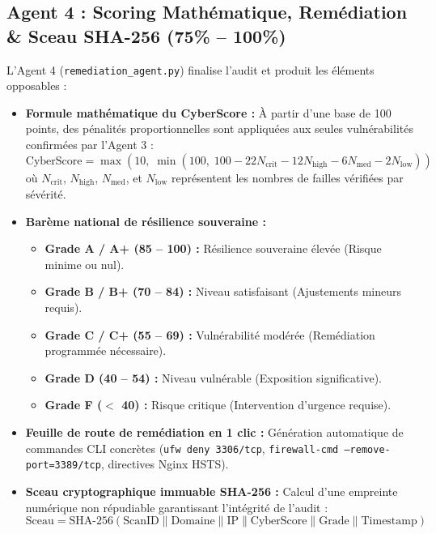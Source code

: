 \documentclass[11pt,a4paper,oneside]{article}
\begin{document}
\subsection{Agent 4 : Scoring Mathématique, Remédiation \& Sceau SHA-256 (75\% -- 100\%)}
L'Agent 4 (\texttt{remediation\_agent.py}) finalise l'audit et produit les éléments opposables :
\begin{itemize}
    \item \textbf{Formule mathématique du CyberScore :} À partir d'une base de 100 points, des pénalités proportionnelles sont appliquées aux seules vulnérabilités confirmées par l'Agent 3 :
    \begin{equation}
        \text{CyberScore} = \max\left(10, \; \min\left(100, \; 100 - 22 N_{\text{crit}} - 12 N_{\text{high}} - 6 N_{\text{med}} - 2 N_{\text{low}}\right)\right)
    \end{equation}
    où $N_{\text{crit}}$, $N_{\text{high}}$, $N_{\text{med}}$, et $N_{\text{low}}$ représentent les nombres de failles vérifiées par sévérité.
    \item \textbf{Barème national de résilience souveraine :}
    \begin{itemize}
        \item \textbf{Grade A / A+ (85 -- 100) :} Résilience souveraine élevée (Risque minime ou nul).
        \item \textbf{Grade B / B+ (70 -- 84) :} Niveau satisfaisant (Ajustements mineurs requis).
        \item \textbf{Grade C / C+ (55 -- 69) :} Vulnérabilité modérée (Remédiation programmée nécessaire).
        \item \textbf{Grade D (40 -- 54) :} Niveau vulnérable (Exposition significative).
        \item \textbf{Grade F ($<$ 40) :} Risque critique (Intervention d'urgence requise).
    \end{itemize}
    \item \textbf{Feuille de route de remédiation en 1 clic :} Génération automatique de commandes CLI concrètes (\texttt{ufw deny 3306/tcp}, \texttt{firewall-cmd --remove-port=3389/tcp}, directives Nginx HSTS).
    \item \textbf{Sceau cryptographique immuable SHA-256 :} Calcul d'une empreinte numérique non répudiable garantissant l'intégrité de l'audit :
    \begin{equation}
        \text{Sceau} = \text{SHA-256}\left(\text{ScanID} \parallel \text{Domaine} \parallel \text{IP} \parallel \text{CyberScore} \parallel \text{Grade} \parallel \text{Timestamp}\right)
    \end{equation}
\end{itemize}
\end{document}
